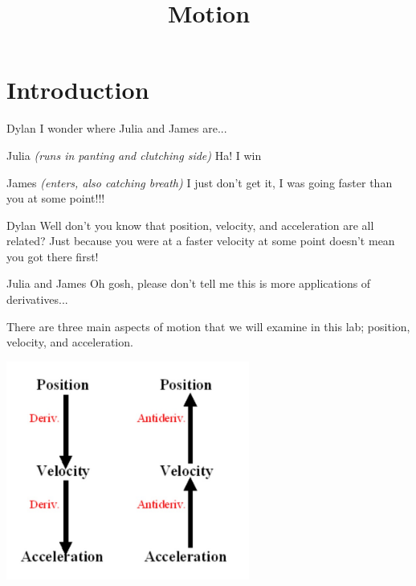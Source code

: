 \documentclass{ximera}
\title{Motion}
\begin{document}
\begin{abstract}
\end{abstract}
\maketitle
\section{Introduction}
\begin{dialogue}
\item[Dylan] I wonder where Julia and James are...
\item[Julia] \textit{(runs in panting and clutching side)} Ha! I win
\item[James] \textit{(enters, also catching breath)} I just don't get it, I was going faster than you at some point!!!
\item[Dylan] Well don't you know that position, velocity, and acceleration are all related? Just because you were at a faster velocity at some point doesn't mean you got there first!
\item[Julia and James] Oh gosh, please don't tell me this is more applications of derivatives...
\end{dialogue}
There are three main aspects of motion that we will examine in this lab; position, velocity, and acceleration.

\begin{image}
    \includegraphics[width=80mm]{motion.jpg}
\end{image}
\end{document}
